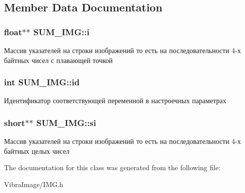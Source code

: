 \subsection{Member Data Documentation}
\hypertarget{class_s_u_m___i_m_g_ac3c585d2cf35e0e9736a19daef633e02}{
\subsubsection[{i}]{\setlength{\rightskip}{0pt plus 5cm}float$\ast$$\ast$ S\+U\+M\+\_\+\+I\+M\+G\+::i}}\label{class_s_u_m___i_m_g_ac3c585d2cf35e0e9736a19daef633e02}


Массив указателей на строки изображений то есть на последовательности 4-\/х байтных чисел с плавающей точкой 

\hypertarget{class_s_u_m___i_m_g_a42cfef194bb1fe08e164e015ad3e6d69}{
\subsubsection[{id}]{\setlength{\rightskip}{0pt plus 5cm}int S\+U\+M\+\_\+\+I\+M\+G\+::id}}\label{class_s_u_m___i_m_g_a42cfef194bb1fe08e164e015ad3e6d69}


Идентификатор соответствующей переменной в настроечных параметрах 

\hypertarget{class_s_u_m___i_m_g_a3da86ff936709e9963e6b0a87406afe1}{
\subsubsection[{si}]{\setlength{\rightskip}{0pt plus 5cm}short$\ast$$\ast$ S\+U\+M\+\_\+\+I\+M\+G\+::si}}\label{class_s_u_m___i_m_g_a3da86ff936709e9963e6b0a87406afe1}


Массив указателей на строки изображений то есть на последовательности 4-\/х байтных целых чисел 



The documentation for this class was generated from the following file\+:\begin{DoxyCompactItemize}
\item 
Vibra\+Image/I\+M\+G.\+h\end{DoxyCompactItemize}
